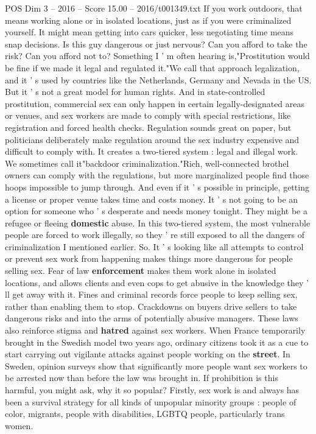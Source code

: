 \begin{textsample}{POS Dim 3 – 2016 – Score 15.00 – 2016/t001349.txt}
If you work outdoors, that means working alone or in isolated locations, just as if you were criminalized yourself.
It might mean getting into cars quicker, less negotiating time means snap decisions.
Is this guy dangerous or just nervous?
Can you afford to take the risk?
Can you afford not to?
Something I ' m often hearing is,"Prostitution would be fine if we made it legal and regulated it."We call that approach legalization, and it ' s used by countries like the Netherlands, Germany and Nevada in the US.
But it ' s not a great model for human rights.
And in state-controlled prostitution, commercial sex can only happen in certain legally-designated areas or venues, and sex workers are made to comply with special restrictions, like registration and forced health checks.
Regulation sounds great on paper, but politicians deliberately make regulation around the sex industry expensive and difficult to comply with.
It creates a two-tiered system : legal and illegal work.
We sometimes call it"backdoor criminalization."Rich, well-connected brothel owners can comply with the regulations, but more marginalized people find those hoops impossible to jump through.
And even if it ' s possible in principle, getting a license or proper venue takes time and costs money.
It ' s not going to be an option for someone who ' s desperate and needs money tonight.
They might be a refugee or fleeing \textbf{domestic} abuse.
In this two-tiered system, the most vulnerable people are forced to work illegally, so they ' re still exposed to all the dangers of criminalization I mentioned earlier.
So.
It ' s looking like all attempts to control or prevent sex work from happening makes things more dangerous for people selling sex.
Fear of law \textbf{enforcement} makes them work alone in isolated locations, and allows clients and even cops to get abusive in the knowledge they ' ll get away with it.
Fines and criminal records force people to keep selling sex, rather than enabling them to stop.
Crackdowns on buyers drive sellers to take dangerous risks and into the arms of potentially abusive managers.
These laws also reinforce stigma and \textbf{hatred} against sex workers.
When France temporarily brought in the Swedish model two years ago, ordinary citizens took it as a cue to start carrying out vigilante attacks against people working on the \textbf{street}.
In Sweden, opinion surveys show that significantly more people want sex workers to be arrested now than before the law was brought in.
If prohibition is this harmful, you might ask, why it so popular?
Firstly, sex work is and always has been a survival strategy for all kinds of unpopular minority groups : people of color, migrants, people with disabilities, LGBTQ people, particularly trans women.

\end{textsample}
